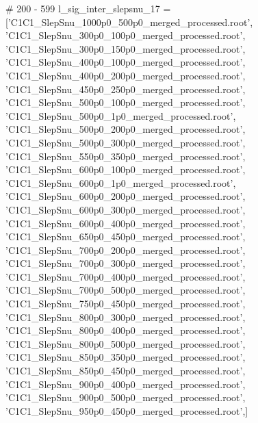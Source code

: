 # 200 - 599
l_sig_inter_slepsnu_17 = ['C1C1_SlepSnu_1000p0_500p0_merged_processed.root',
'C1C1_SlepSnu_300p0_100p0_merged_processed.root',
'C1C1_SlepSnu_300p0_150p0_merged_processed.root',
'C1C1_SlepSnu_400p0_100p0_merged_processed.root',
'C1C1_SlepSnu_400p0_200p0_merged_processed.root',
'C1C1_SlepSnu_450p0_250p0_merged_processed.root',
'C1C1_SlepSnu_500p0_100p0_merged_processed.root',
'C1C1_SlepSnu_500p0_1p0_merged_processed.root',
'C1C1_SlepSnu_500p0_200p0_merged_processed.root',
'C1C1_SlepSnu_500p0_300p0_merged_processed.root',
'C1C1_SlepSnu_550p0_350p0_merged_processed.root',
'C1C1_SlepSnu_600p0_100p0_merged_processed.root',
'C1C1_SlepSnu_600p0_1p0_merged_processed.root',
'C1C1_SlepSnu_600p0_200p0_merged_processed.root',
'C1C1_SlepSnu_600p0_300p0_merged_processed.root',
'C1C1_SlepSnu_600p0_400p0_merged_processed.root',
'C1C1_SlepSnu_650p0_450p0_merged_processed.root',
'C1C1_SlepSnu_700p0_200p0_merged_processed.root',
'C1C1_SlepSnu_700p0_300p0_merged_processed.root',
'C1C1_SlepSnu_700p0_400p0_merged_processed.root',
'C1C1_SlepSnu_700p0_500p0_merged_processed.root',
'C1C1_SlepSnu_750p0_450p0_merged_processed.root',
'C1C1_SlepSnu_800p0_300p0_merged_processed.root',
'C1C1_SlepSnu_800p0_400p0_merged_processed.root',
'C1C1_SlepSnu_800p0_500p0_merged_processed.root',
'C1C1_SlepSnu_850p0_350p0_merged_processed.root',
'C1C1_SlepSnu_850p0_450p0_merged_processed.root',
'C1C1_SlepSnu_900p0_400p0_merged_processed.root',
'C1C1_SlepSnu_900p0_500p0_merged_processed.root',
'C1C1_SlepSnu_950p0_450p0_merged_processed.root',]

